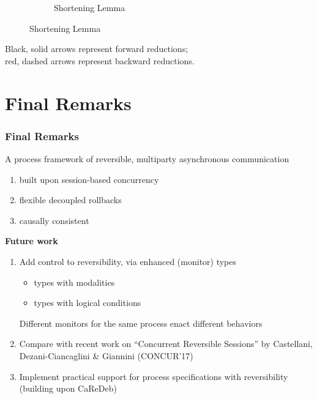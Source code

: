 \documentclass[12pt]{beamer}
\newcommand{\bi}{\begin{enumerate}[$\bullet$]}
\newcommand{\ei}{\end{enumerate}}
\begin{document}
\begin{frame}
\begin{figure}[!t]
\begin{subfigure}[b]{3.7cm}
        \caption{Shortening Lemma %
        }
        \label{fig:short}
    \end{subfigure}
    \end{figure}
    	\vspace{-5mm}
    {\small Black, solid arrows represent forward reductions; \\ red, dashed arrows represent backward reductions. }
	\end{frame}



%

\section{Final Remarks}
\begin{frame}
	\frametitle{Final Remarks}
	A process framework of reversible, multiparty asynchronous communication
	\bi
	\item built upon session-based concurrency
	\item flexible decoupled rollbacks
	\item causally consistent
	\ei 
	
	\bigskip
	
	\textbf{Future work}
	\bi
		\item Add control to reversibility, via enhanced (monitor) types
			\begin{itemize}
				\item types with modalities
				\item types with logical conditions
			\end{itemize}
			Different monitors for the same process enact different behaviors 
		\item Compare with recent work on ``Concurrent Reversible Sessions''
		by Castellani, Dezani-Ciancaglini \& Giannini (CONCUR'17)
		\item Implement practical support for process specifications with reversibility (building upon CaReDeb)
	\ei
\end{frame}
\end{document}
